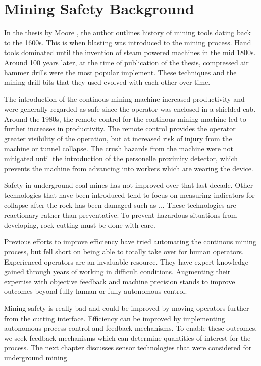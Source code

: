 \chapter{
Mining Safety Background
\label{chapTwo}}

In the thesis by Moore \cite{11124/16423}, the author outlines history of mining tools
dating back to the 1600s. This is when blasting was introduced to the mining process.
Hand tools dominated until the invention of steam powered machines in the mid 1800s.
Around 100 years later, at the time of publication of the thesis, compressed air hammer drills
were the most popular implement. These techniques and the mining drill bits that they used
evolved with each other over time.

The introduction of the continous mining machine increased productivity and 
were generally regarded as safe since the operator was enclosed in a shielded cab.
Around the 1980s, the remote control for the continous mining machine led to 
further increases in productivity. 
The remote control provides the operator greater visibility of the operation, 
but at increased risk of injury from the machine or tunnel collapse.
The crush hazards from the machine were not mitigated until the introduction of the
personelle proximity detector, which prevents the machine from advancing into 
workers which are wearing the device.

Safety in underground coal mines has not improved over that last decade.
Other technologies that have been introduced tend to focus on measuring
indicators for collapse after the rock has been damaged such as ...
These technologies are reactionary rather than preventative.
To prevent hazardous situations from developing, rock cutting must be done with care.

Previous efforts to improve efficiency have tried automating the continous mining process,
but fell short on being able to totally take over for human operators. 
Experienced operators are an invaluable resource. They have expert knowledge gained
through years of working in difficult conditions. 
Augmenting their expertise with objective feedback and machine precision stands to 
improve outcomes beyond fully human or fully autonomous control.

Mining safety is really bad and could be improved by moving operators further from the cutting interface.
Efficiency can be improved by implementing autonomous process control and feedback mechanisms.
To enable these outcomes, we seek feedback mechanisms which can determine quantities of interest for the process.
The next chapter discusses sensor technologies that were considered for underground mining.
